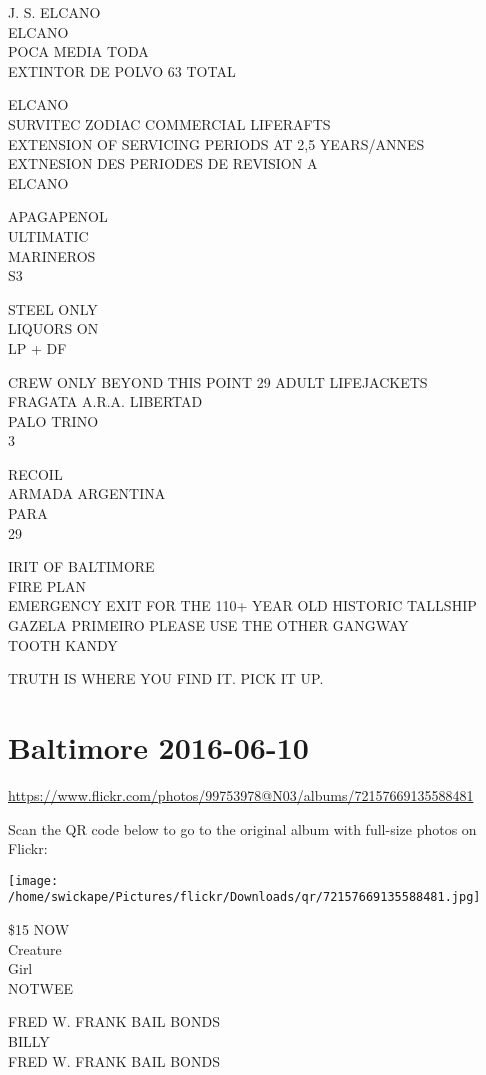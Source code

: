 \documentclass[10pt,letterpaper]{article}
\begin{document}
J. S. ELCANO\\
ELCANO\\
POCA MEDIA TODA\\
EXTINTOR DE POLVO 63 TOTAL

ELCANO\\
SURVITEC ZODIAC COMMERCIAL LIFERAFTS\\
EXTENSION OF SERVICING PERIODS AT 2,5 YEARS/ANNES EXTNESION DES PERIODES DE REVISION A\\
ELCANO

APAGAPENOL\\
ULTIMATIC\\
MARINEROS\\
S3

STEEL ONLY\\
LIQUORS ON\\
LP + DF

CREW ONLY BEYOND THIS POINT 29 ADULT LIFEJACKETS\\
FRAGATA A.R.A. LIBERTAD\\
PALO TRINO\\
3

RECOIL\\
ARMADA ARGENTINA\\
PARA\\
29

IRIT OF BALTIMORE\\
FIRE PLAN\\
EMERGENCY EXIT FOR THE 110+ YEAR OLD HISTORIC TALLSHIP GAZELA PRIMEIRO PLEASE USE THE OTHER GANGWAY\\
TOOTH KANDY

TRUTH IS WHERE YOU FIND IT.  PICK IT UP.


\section*{Baltimore 2016-06-10}

\url{https://www.flickr.com/photos/99753978@N03/albums/72157669135588481}

Scan the QR code below to go to the original album with full-size photos on Flickr:

\texttt{[image: /home/swickape/Pictures/flickr/Downloads/qr/72157669135588481.jpg]}


\$15 NOW\\
Creature\\
Girl\\
NOTWEE

FRED W. FRANK BAIL BONDS\\
BILLY\\
FRED W. FRANK BAIL BONDS
\end{document}
